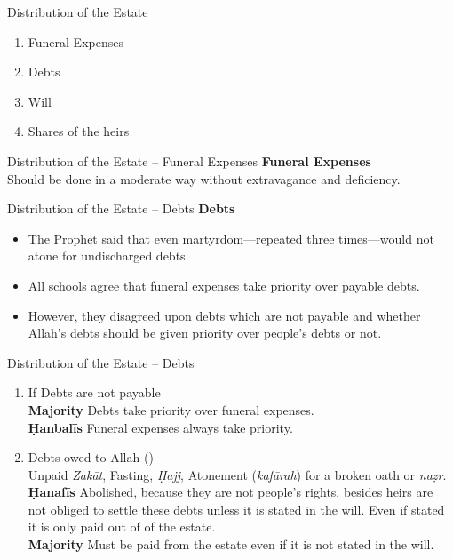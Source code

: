 \begin{frame}{Distribution of the Estate}
\begin{enumerate}
\item Funeral Expenses
\item Debts
\item Will
\item Shares of the heirs
\end{enumerate}
\end{frame}

\begin{frame}{Distribution of the Estate -- Funeral Expenses}
\textbf{Funeral Expenses}\\
Should be done in a moderate way without extravagance and deficiency.
\end{frame}

\begin{frame}{Distribution of the Estate -- Debts}
\textbf{Debts}\\
\begin{itemize}
\item The Prophet \pbuh said that even martyrdom---repeated three times---would not atone for undischarged debts.
\item All schools agree that funeral expenses take priority over payable debts.
\item However, they disagreed upon debts which are not payable and whether Allah’s debts should be given priority over people’s debts or not.
\end{itemize}
\end{frame}

\begin{frame}{Distribution of the Estate -- Debts}
\begin{enumerate}[A]
\item If Debts are not payable\\
\textbf{Majority} Debts take priority over funeral expenses.\\
\textbf{Ḥanbalīs} Funeral expenses always take priority.
\item Debts owed to Allah ({})\\
Unpaid \textit{Zakāt}, Fasting, \textit{Ḥajj}, Atonement (\textit{kafārah}) for a broken oath or \textit{naẓr}.\\
\textbf{Ḥanafīs} Abolished, because they are not people’s rights, besides heirs are not obliged to settle these  debts unless it is stated in the will. Even if stated it is only paid out of  of the estate.\\
\textbf{Majority} Must be paid from the estate even if it is not stated in the will.
\end{enumerate}
\end{frame}

